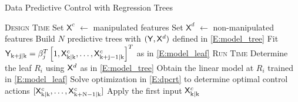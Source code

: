 \begin{algorithm}[t!]
	\caption{Data Predictive Control with Regression Trees}
	\label{A:dpcrt}
	\begin{algorithmic}[1]
		\State \textsc{Design Time}
		\State Set $\mathsf{X}^c$ $\gets$ manipulated features
		\State Set $\mathsf{X}^d$ $\gets$ non-manipulated features
		\State Build $N$ predictive trees with $(\mathsf{Y},\mathsf{X}^d)$ defined in \eqref{E:model_tree}
		\State Fit $ \mathsf{Y}_{\mathrm{k+j|k}} =  \beta^T_j \left[1,\mathsf{X}^c_{\mathrm{k|k}},\dots,\mathsf{X}^c_{\mathrm{k+j-1|k}} \right]^T$ as in \eqref{E:model_leaf}
		\EndFor
		\EndFor
		\EndProcedure
		\State \textsc{Run Time}
		\State Determine the leaf $R_i$ using $\mathsf{X}^d$ as in \eqref{E:model_tree}
		\State Obtain the linear model at $R_{i}$ trained in \eqref{E:model_leaf}
		\EndFor
		\State Solve optimization in \eqref{E:dpcrt} to determine optimal
		\State control actions $[\mathsf{X}^c_{\mathrm{k|k}},\dots,\mathsf{X}^c_{\mathrm{k+N-1|k}}]$
		\State Apply the first input $\mathsf{X}^c_{\mathrm{k|k}}$
		\EndWhile
		\EndProcedure
	\end{algorithmic}
\end{algorithm}

